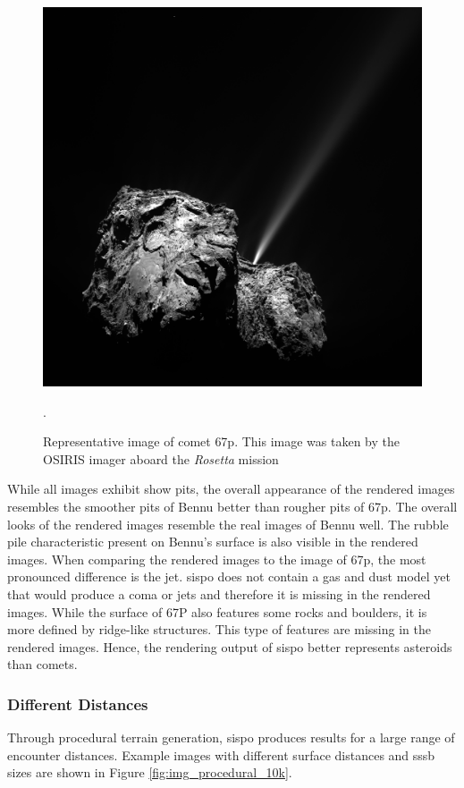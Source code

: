 \begin{figure}[htb]
    \centering
    \includegraphics[width=.8\textwidth]{doc/thesis/0_figures/procedural_terrain/67P_CG.PNG}
    \caption{Representative image of comet \acrlong{67p}. This image was taken by the OSIRIS imager aboard the \textit{Rosetta} mission \cite{OSIRISArchiveb}}.
    \label{fig:render_quali_67p}
\end{figure}

While all images exhibit show pits, the overall appearance of the rendered images resembles the smoother pits of Bennu better than rougher pits of \gls{67p}. The overall looks of the rendered images resemble the real images of Bennu well. The rubble pile characteristic present on Bennu's surface is also visible in the rendered images. When comparing the rendered images to the image of \gls{67p}, the most pronounced difference is the jet. \Gls{sispo} does not contain a gas and dust model yet that would produce a coma or jets and therefore it is missing in the rendered images. While the surface of 67P also features some rocks and boulders, it is more defined by ridge-like structures. This type of features are missing in the rendered images. Hence, the rendering output of \gls{sispo} better represents asteroids than comets.

\subsubsection{Different Distances}
Through procedural terrain generation, \gls{sispo} produces results for a large range of encounter distances. Example images with different surface distances and \gls{sssb} sizes are shown in Figure \ref{fig:img_procedural_10k}.

